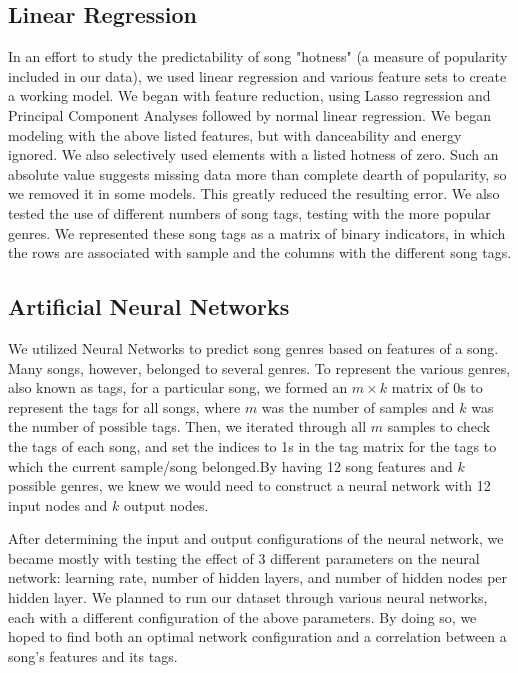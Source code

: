 \documentclass[12pt]{article}
\begin{document}
\subsection{Linear Regression}
\label{subsec:linearRegression}
In an effort to study the predictability of song "hotness" (a measure of popularity included in our data), we used linear regression and various feature sets to create a working model. We began with feature reduction, using Lasso regression and Principal Component Analyses followed by normal linear regression. We began modeling with the above listed features, but with danceability and energy ignored. We also selectively used elements with a listed hotness of zero. Such an absolute value suggests missing data more than complete dearth of popularity, so we removed it in some models. This greatly reduced the resulting error. We also tested the use of different numbers of song tags, testing with the more popular genres. We represented these song tags as a matrix of binary indicators, in which the rows are associated with sample and the columns with the different song tags.

\subsection{Artificial Neural Networks}
\label{subsec:ann}
We utilized Neural Networks to predict song genres based on features of a song. Many songs, however, belonged to several genres. To represent the various genres, also known as tags, for a particular song, we formed an $m \times k$ matrix of 0s to represent the tags for all songs, where $m$ was the number of samples and $k$ was the number of possible tags. Then, we iterated through all $m$ samples to check the tags of each song, and set the indices to 1s in the tag matrix for the tags to which the current sample/song belonged.By having 12 song features and $k$ possible genres, we knew we would need to construct a neural network with 12 input nodes and $k$ output nodes. 

After determining the input and output configurations of the neural network, we became mostly with testing the effect of 3 different parameters on the neural network: learning rate, number of hidden layers, and number of hidden nodes per hidden layer. We planned to run our dataset through various neural networks, each with a different configuration of the above parameters. By doing so, we hoped to find both an optimal network configuration and a correlation between a song's features and its tags. 
\end{document}
